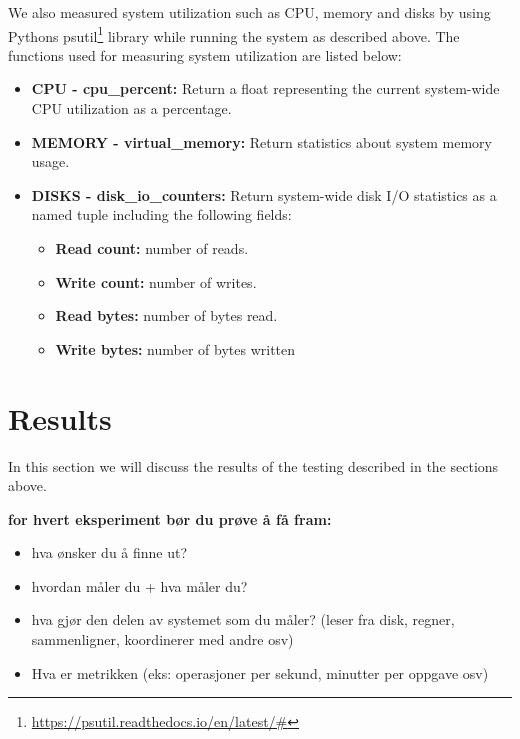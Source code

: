 \documentclass[USenglish]{uit-thesis}
\begin{document}



We also measured system utilization such as CPU, memory and disks by using Pythons psutil\footnote{\url{https://psutil.readthedocs.io/en/latest/\#}} library while running the system as described above. 
The functions used for measuring system utilization are listed below:

\begin{itemize}
\item \textbf{CPU - cpu\_percent:} Return a float representing the current system-wide CPU utilization as a percentage.
\item \textbf{MEMORY - virtual\_memory:} Return statistics about system memory usage.
\item \textbf{DISKS - disk\_io\_counters:} Return system-wide disk I/O statistics as a named tuple including the following fields:
	\begin{itemize}
	\item \textbf{Read count:} number of reads.
	\item \textbf{Write count:} number of writes.
	\item \textbf{Read bytes:} number of bytes read.
	\item \textbf{Write bytes:} number of bytes written
	\end{itemize}
\end{itemize}



\section{Results}
In this section we will discuss the results of the testing described in the sections above.


\iffalse
\textbf{for hvert eksperiment bør du prøve å få fram:}
\begin{itemize}
\item hva ønsker du å finne ut? 
\item hvordan måler du + hva måler du? 
\item hva gjør den delen av systemet som du måler? (leser fra disk, regner, sammenligner, koordinerer med andre osv)
\item Hva er metrikken (eks: operasjoner per sekund, minutter per oppgave osv)
\end{itemize}
\end{document}
